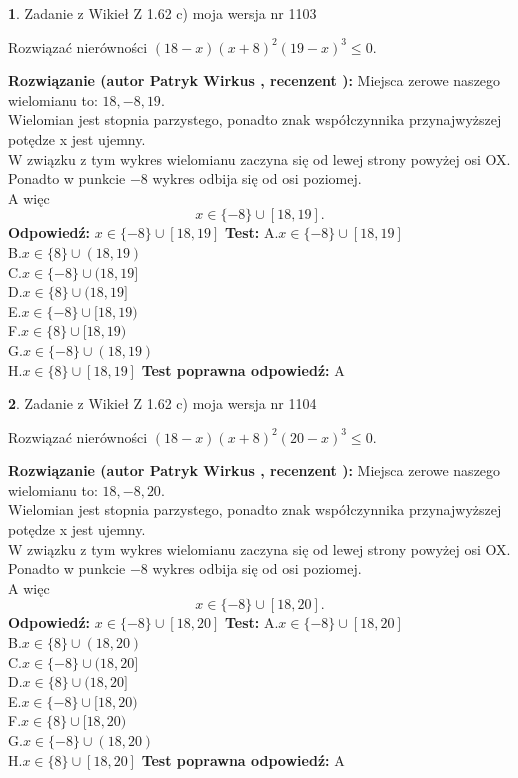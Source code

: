 \documentclass[12pt, a4paper]{article}
\theoremstyle{definition} %
\newtheorem{zad}{}
\newcommand{\zadStart}[1]{\begin{zad}#1\newline}
\newcommand{\zadStop}{\end{zad}}
\newcommand{\rozwStart}[2]{\noindent \textbf{Rozwiązanie (autor #1 , recenzent #2): }\newline}
\newcommand{\rozwStop}{\newline}
\newcommand{\odpStart}{\noindent \textbf{Odpowiedź:}\newline}
\newcommand{\odpStop}{\newline}
\newcommand{\testStart}{\noindent \textbf{Test:}\newline}
\newcommand{\testStop}{\newline}
\newcommand{\kluczStart}{\noindent \textbf{Test poprawna odpowiedź:}\newline}
\newcommand{\kluczStop}{\newline}
\begin{document}
\zadStart{Zadanie z Wikieł Z 1.62 c) moja wersja nr 1103}

Rozwiązać nierówności $(18-x)(x+8)^{2}(19-x)^{3}\le0$.
\zadStop
\rozwStart{Patryk Wirkus}{}
Miejsca zerowe naszego wielomianu to: $18, -8, 19$.\\
Wielomian jest stopnia parzystego, ponadto znak współczynnika przy\linebreak najwyższej potędze x jest ujemny.\\ W związku z tym wykres wielomianu zaczyna się od lewej strony powyżej osi OX.\\
Ponadto w punkcie $-8$ wykres odbija się od osi poziomej.\\
A więc $$x \in \{-8\} \cup [18,19].$$
\rozwStop
\odpStart
$x \in \{-8\} \cup [18,19]$
\odpStop
\testStart
A.$x \in \{-8\} \cup [18,19]$\\
B.$x \in \{8\} \cup (18,19)$\\
C.$x \in \{-8\} \cup (18,19]$\\
D.$x \in \{8\} \cup (18,19]$\\
E.$x \in \{-8\} \cup [18,19)$\\
F.$x \in \{8\} \cup [18,19)$\\
G.$x \in \{-8\} \cup (18,19)$\\
H.$x \in \{8\} \cup [18,19]$
\testStop
\kluczStart
A
\kluczStop



\zadStart{Zadanie z Wikieł Z 1.62 c) moja wersja nr 1104}

Rozwiązać nierówności $(18-x)(x+8)^{2}(20-x)^{3}\le0$.
\zadStop
\rozwStart{Patryk Wirkus}{}
Miejsca zerowe naszego wielomianu to: $18, -8, 20$.\\
Wielomian jest stopnia parzystego, ponadto znak współczynnika przy\linebreak najwyższej potędze x jest ujemny.\\ W związku z tym wykres wielomianu zaczyna się od lewej strony powyżej osi OX.\\
Ponadto w punkcie $-8$ wykres odbija się od osi poziomej.\\
A więc $$x \in \{-8\} \cup [18,20].$$
\rozwStop
\odpStart
$x \in \{-8\} \cup [18,20]$
\odpStop
\testStart
A.$x \in \{-8\} \cup [18,20]$\\
B.$x \in \{8\} \cup (18,20)$\\
C.$x \in \{-8\} \cup (18,20]$\\
D.$x \in \{8\} \cup (18,20]$\\
E.$x \in \{-8\} \cup [18,20)$\\
F.$x \in \{8\} \cup [18,20)$\\
G.$x \in \{-8\} \cup (18,20)$\\
H.$x \in \{8\} \cup [18,20]$
\testStop
\kluczStart
A
\kluczStop
\end{document}
